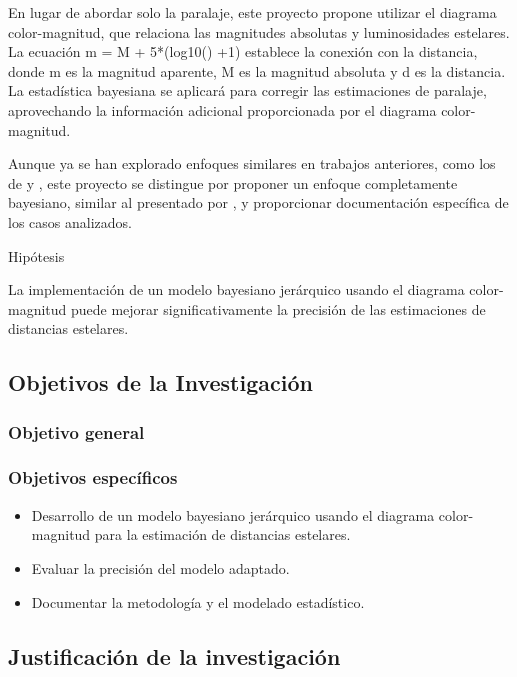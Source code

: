 \documentclass[stu, 12pt, letterpaper, donotrepeattitle, floatsintext, natbib]{apa7}
\begin{document}
En lugar de abordar solo la paralaje, este proyecto propone utilizar
el diagrama color-magnitud, que relaciona las magnitudes absolutas y
luminosidades estelares. La ecuación  m = M + 5*(log10() +1) establece
la conexión con la distancia, donde m es la magnitud aparente, M es la
magnitud absoluta y d es la distancia. La estadística bayesiana se
aplicará para corregir las estimaciones de paralaje, aprovechando
la información adicional proporcionada por el diagrama color-magnitud.

Aunque ya se han explorado enfoques similares en trabajos anteriores,
como los de  y ,
este proyecto se distingue por proponer un enfoque completamente bayesiano,
similar al presentado por , y proporcionar documentación
específica de los casos analizados.

Hipótesis

La implementación de un modelo bayesiano jerárquico usando el diagrama
color-magnitud puede mejorar significativamente la precisión de las
estimaciones de distancias estelares.

\subsection{Objetivos de la Investigación}

\subsubsection{Objetivo general}

\subsubsection{Objetivos específicos}

\begin{itemize}
    \item Desarrollo de un modelo bayesiano jerárquico usando el diagrama color-magnitud para la estimación de distancias estelares.
    \item Evaluar la precisión del modelo adaptado.
    \item Documentar la metodología y el modelado estadístico.
\end{itemize}

\subsection{Justificación de la investigación}
\end{document}
